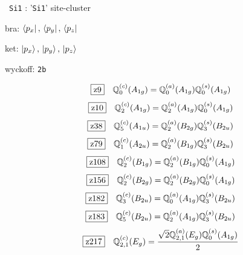 \documentclass[fleqn,10pt,landscape]{jsarticle}
\begin{document}
\noindent\textbullet\, \texttt{Si1} : '\texttt{Si1}' site-cluster

\noindent\quad * bra: $\bra{p_{x}},\, \bra{p_{y}},\, \bra{p_{z}}$

\noindent\quad * ket: $\ket{p_{x}},\, \ket{p_{y}},\, \ket{p_{z}}$

\noindent\quad * wyckoff: \texttt{2b}

\begin{dmath*}
\hspace*{3mm}\fbox{z9}\quad \mathbb{Q}_{0}^{(c)}(A_{1g})=\mathbb{Q}_{0}^{(a)}(A_{1g}) \mathbb{Q}_{0}^{(s)}(A_{1g})
\end{dmath*}
\begin{dmath*}
\hspace*{3mm}\fbox{z10}\quad \mathbb{Q}_{2}^{(c)}(A_{1g})=\mathbb{Q}_{2}^{(a)}(A_{1g}) \mathbb{Q}_{0}^{(s)}(A_{1g})
\end{dmath*}
\begin{dmath*}
\hspace*{3mm}\fbox{z38}\quad \mathbb{Q}_{5}^{(c)}(A_{1u})=\mathbb{Q}_{2}^{(a)}(B_{2g}) \mathbb{Q}_{3}^{(s)}(B_{2u})
\end{dmath*}
\begin{dmath*}
\hspace*{3mm}\fbox{z79}\quad \mathbb{Q}_{1}^{(c)}(A_{2u})=\mathbb{Q}_{2}^{(a)}(B_{1g}) \mathbb{Q}_{3}^{(s)}(B_{2u})
\end{dmath*}
\begin{dmath*}
\hspace*{3mm}\fbox{z108}\quad \mathbb{Q}_{2}^{(c)}(B_{1g})=\mathbb{Q}_{2}^{(a)}(B_{1g}) \mathbb{Q}_{0}^{(s)}(A_{1g})
\end{dmath*}
\begin{dmath*}
\hspace*{3mm}\fbox{z156}\quad \mathbb{Q}_{2}^{(c)}(B_{2g})=\mathbb{Q}_{2}^{(a)}(B_{2g}) \mathbb{Q}_{0}^{(s)}(A_{1g})
\end{dmath*}
\begin{dmath*}
\hspace*{3mm}\fbox{z182}\quad \mathbb{Q}_{3}^{(c)}(B_{2u})=\mathbb{Q}_{0}^{(a)}(A_{1g}) \mathbb{Q}_{3}^{(s)}(B_{2u})
\end{dmath*}
\begin{dmath*}
\hspace*{3mm}\fbox{z183}\quad \mathbb{Q}_{5}^{(c)}(B_{2u})=\mathbb{Q}_{2}^{(a)}(A_{1g}) \mathbb{Q}_{3}^{(s)}(B_{2u})
\end{dmath*}
\begin{dmath*}
\hspace*{3mm}\fbox{z217}\quad \mathbb{Q}_{2,1}^{(c)}(E_{g})=\frac{\sqrt{2} \mathbb{Q}_{2,1}^{(a)}(E_{g}) \mathbb{Q}_{0}^{(s)}(A_{1g})}{2}
\end{dmath*}
\end{document}
